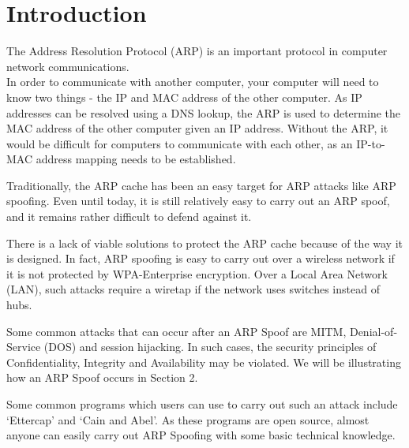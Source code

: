 \documentclass{acm_proc_article-sp}
\begin{document}




\section{Introduction}
The Address Resolution Protocol (ARP) is an important protocol in computer network communications. \\
In order to communicate with another computer, your computer will need to know two things - the IP and MAC address of the other computer. As IP addresses can be resolved using a DNS lookup, the ARP is used to determine the MAC address of the other computer given an IP address. Without the ARP, it would be difficult for computers to communicate with each other, as an IP-to-MAC address mapping needs to be established. 

Traditionally, the ARP cache has been an easy target for ARP attacks like ARP spoofing. Even until today, it is still relatively easy to carry out an ARP spoof, and it remains rather difficult to defend against it. 

There is a lack of viable solutions to protect the ARP cache because of the way it is designed. In fact, ARP spoofing is easy to carry out over a wireless network if it is not protected by WPA-Enterprise encryption. Over a Local Area Network (LAN), such attacks require a wiretap if the network uses switches instead of hubs. 

Some common attacks that can occur after an ARP Spoof are MITM, Denial-of-Service (DOS) and session hijacking. 
In such cases, the security principles of Confidentiality, Integrity and Availability may be violated. 
We will be illustrating how an ARP Spoof occurs in Section 2. 

Some common programs which users can use to carry out such an attack include `Ettercap' and `Cain and Abel'. As these programs are open source, almost anyone can easily carry out ARP Spoofing with some basic technical knowledge. 
\end{document}

